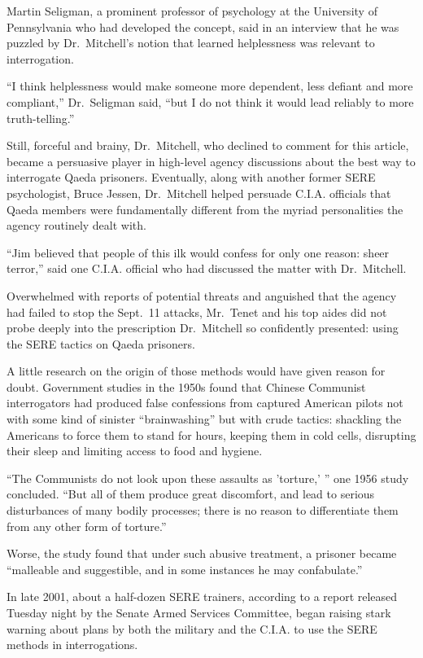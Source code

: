 \documentclass[12pt,a4paper,onecolumn]{article}
\begin{document}
Martin Seligman, a prominent professor of psychology at the University of Pennsylvania who had
developed the concept, said in an interview that he was puzzled by Dr.~Mitchell's notion that
learned helplessness was relevant to interrogation.

``I think helplessness would make someone more dependent, less defiant and more compliant,''
Dr.~Seligman said, ``but I do not think it would lead reliably to more truth-telling.''

Still, forceful and brainy, Dr.~Mitchell, who declined to comment for this article, became a
persuasive player in high-level agency discussions about the best way to interrogate Qaeda
prisoners. Eventually, along with another former SERE psychologist, Bruce Jessen, Dr.~Mitchell
helped persuade C.I.A. officials that Qaeda members were fundamentally different from the myriad
personalities the agency routinely dealt with.

``Jim believed that people of this ilk would confess for only one reason: sheer terror,'' said one
C.I.A. official who had discussed the matter with Dr.~Mitchell.

Overwhelmed with reports of potential threats and anguished that the agency had failed to stop the
Sept.~11 attacks, Mr.~Tenet and his top aides did not probe deeply into the prescription
Dr.~Mitchell so confidently presented: using the SERE tactics on Qaeda prisoners.

A little research on the origin of those methods would have given reason for doubt. Government
studies in the 1950s found that Chinese Communist interrogators had produced false confessions from
captured American pilots not with some kind of sinister ``brainwashing'' but with crude tactics:
shackling the Americans to force them to stand for hours, keeping them in cold cells, disrupting
their sleep and limiting access to food and hygiene.

``The Communists do not look upon these assaults as 'torture,' '' one 1956 study concluded. ``But
all of them produce great discomfort, and lead to serious disturbances of many bodily processes;
there is no reason to differentiate them from any other form of torture.''

Worse, the study found that under such abusive treatment, a prisoner became ``malleable and
suggestible, and in some instances he may confabulate.''

In late 2001, about a half-dozen SERE trainers, according to a report released Tuesday night by the
Senate Armed Services Committee, began raising stark warning about plans by both the military and
the C.I.A. to use the SERE methods in interrogations.
\end{document}
